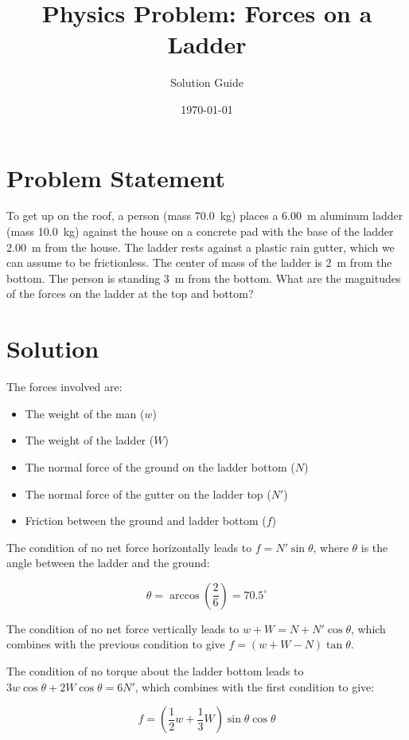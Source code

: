 \documentclass{article}
\title{Physics Problem: Forces on a Ladder}
\author{Solution Guide}
\date{\today}
\begin{document}
\maketitle

\section*{Problem Statement}
To get up on the roof, a person (mass \SI{70.0}{\kilogram}) places a \SI{6.00}{\meter} aluminum ladder (mass \SI{10.0}{\kilogram}) against the house on a concrete pad with the base of the ladder \SI{2.00}{\meter} from the house. The ladder rests against a plastic rain gutter, which we can assume to be frictionless. The center of mass of the ladder is \SI{2}{\meter} from the bottom. The person is standing \SI{3}{\meter} from the bottom. What are the magnitudes of the forces on the ladder at the top and bottom?

\section*{Solution}
The forces involved are:
\begin{itemize}
    \item The weight of the man ($w$)
    \item The weight of the ladder ($W$)
    \item The normal force of the ground on the ladder bottom ($N$)
    \item The normal force of the gutter on the ladder top ($N'$)
    \item Friction between the ground and ladder bottom ($f$)
\end{itemize}

The condition of no net force horizontally leads to $f = N' \sin \theta$, where $\theta$ is the angle between the ladder and the ground:

\begin{equation}
    \theta = \arccos\left(\frac{2}{6}\right) = 70.5^\circ
\end{equation}

The condition of no net force vertically leads to $w + W = N + N' \cos \theta$, which combines with the previous condition to give $f = (w + W - N)\tan \theta$. 

The condition of no torque about the ladder bottom leads to $3w\cos \theta + 2W\cos \theta = 6N'$, which combines with the first condition to give:

\begin{equation}
    f = \left(\frac{1}{2}w + \frac{1}{3}W\right)\sin \theta \cos \theta
\end{equation}
\end{document}

